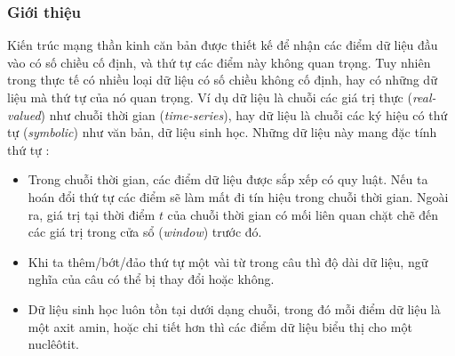 \subsubsection{Giới thiệu}
Kiến trúc mạng thần kinh căn bản được thiết kế để nhận các điểm dữ liệu đầu vào có số chiều cố định, và thứ tự các điểm này không quan trọng. Tuy nhiên trong thực tế có nhiều loại dữ liệu có số chiều không cố định, hay có những dữ liệu mà thứ tự của nó quan trọng. Ví dụ dữ liệu là chuỗi các giá trị thực (\textit{real-valued}) như chuỗi thời gian (\textit{time-series}), hay dữ liệu là chuỗi các ký hiệu có thứ tự (\textit{symbolic}) như văn bản, dữ liệu sinh học. Những dữ liệu này mang đặc tính thứ tự \cite{Aggarwal2023}:
\begin{itemize}
    \item Trong chuỗi thời gian, các điểm dữ liệu được sắp xếp có quy luật. Nếu ta hoán đổi thứ tự các điểm sẽ làm mất đi tín hiệu trong chuỗi thời gian. Ngoài ra, giá trị tại thời điểm $t$ của chuỗi thời gian có mối liên quan chặt chẽ đến các giá trị trong cửa sổ (\textit{window}) trước đó.
    \item Khi ta thêm/bớt/đảo thứ tự một vài từ trong câu thì độ dài dữ liệu, ngữ nghĩa của câu có thể bị thay đổi hoặc không.
    \item Dữ liệu sinh học luôn tồn tại dưới dạng chuỗi, trong đó mỗi điểm dữ liệu là một axit amin, hoặc chi tiết hơn thì các điểm dữ liệu biểu thị cho một nuclêôtit.
\end{itemize}
